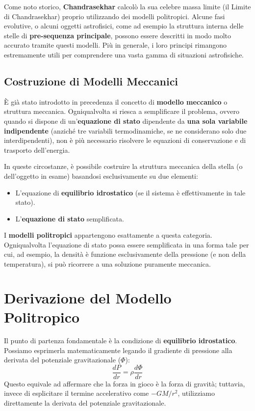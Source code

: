Come noto storico, \textbf{Chandrasekhar} calcolò la sua celebre massa limite (il Limite di Chandrasekhar) proprio utilizzando dei modelli politropici. Alcune fasi evolutive, o alcuni oggetti astrofisici, come ad esempio la struttura interna delle stelle di \textbf{pre-sequenza principale}, possono essere descritti in modo molto accurato tramite questi modelli. Più in generale, i loro principi rimangono estremamente utili per comprendere una vasta gamma di situazioni astrofisiche.

\subsection{Costruzione di Modelli Meccanici}

È già stato introdotto in precedenza il concetto di \textbf{modello meccanico} o struttura meccanica. Ogniqualvolta si riesca a semplificare il problema, ovvero quando si dispone di un'\textbf{equazione di stato} dipendente da \textbf{una sola variabile indipendente} (anziché tre variabili termodinamiche, se ne considerano solo due interdipendenti), non è più necessario risolvere le equazioni di conservazione e di trasporto dell'energia.

In queste circostanze, è possibile costruire la struttura meccanica della stella (o dell'oggetto in esame) basandosi esclusivamente su due elementi:
\begin{itemize}
\item L'equazione di \textbf{equilibrio idrostatico} (se il sistema è effettivamente in tale stato).
\item L'\textbf{equazione di stato} semplificata.
\end{itemize}

I \textbf{modelli politropici} appartengono esattamente a questa categoria. Ogniqualvolta l'equazione di stato possa essere semplificata in una forma tale per cui, ad esempio, la densità è funzione esclusivamente della pressione (e non della temperatura), si può ricorrere a una soluzione puramente meccanica.

\section{Derivazione del Modello Politropico}

Il punto di partenza fondamentale è la condizione di \textbf{equilibrio idrostatico}. Possiamo esprimerla matematicamente legando il gradiente di pressione alla derivata del potenziale gravitazionale ($\Phi$):
\begin{equation}
\frac{dP}{dr} = \rho \frac{d\Phi}{dr}
\end{equation}
Questo equivale ad affermare che la forza in gioco è la forza di gravità; tuttavia, invece di esplicitare il termine accelerativo come $-G M / r^2$, utilizziamo direttamente la derivata del potenziale gravitazionale.

